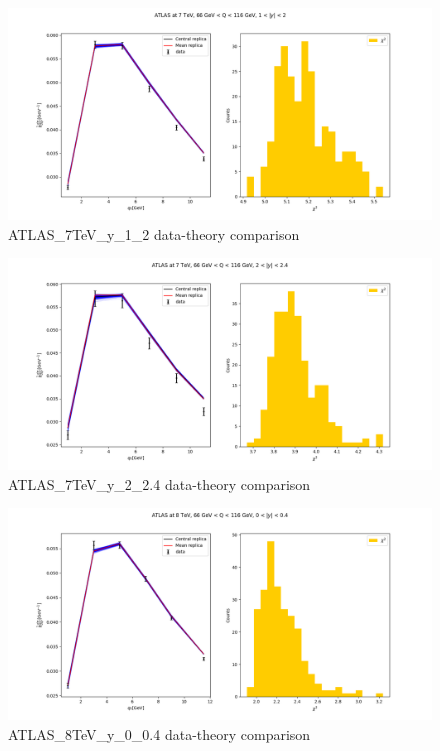 \documentclass[
]{article}
\begin{document}
\begin{figure}
\centering
\includegraphics{pngplots/ATLAS_7TeV_y_1_2.png}
\caption{ATLAS\_7TeV\_y\_1\_2 data-theory comparison}
\end{figure}

\begin{figure}
\centering
\includegraphics{pngplots/ATLAS_7TeV_y_2_2.4.png}
\caption{ATLAS\_7TeV\_y\_2\_2.4 data-theory comparison}
\end{figure}

\begin{figure}
\centering
\includegraphics{pngplots/ATLAS_8TeV_y_0_0.4.png}
\caption{ATLAS\_8TeV\_y\_0\_0.4 data-theory comparison}
\end{figure}
\end{document}
